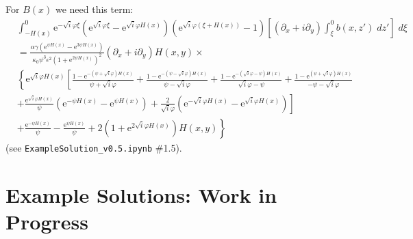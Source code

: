 \documentclass[10pt]{amsart}
\begin{document}
For $B(x)$ we need this term:
 \begin{align}
& \int_{-H(x)}^{0} 
\mathrm{e}^{-\sqrt{i} \varphi \xi} 
\left(
\mathrm{e}^{\sqrt{i} \varphi \xi} - 
\mathrm{e}^{\sqrt{i} \varphi H(x)} 
\right) \left(
\mathrm{e}^{\sqrt{i} \varphi  \left( \xi + H(x) \right)} - 1
\right)
 \left[ \left( \partial_x + i \partial_y \right) \int_{\xi}^{0} b(x,z') \; dz'  \right] \; d \xi   \nonumber  \\
& =
\frac{ \alpha  \gamma\left(\mathrm{e}^{\psi H(x)} -  \mathrm{e}^{3 \psi H(x)}  \right)}{\kappa_0  \psi^{3} \epsilon^{2} \left( 1 + \mathrm{e}^{2 \psi H(x)} \right)^{2}}
\left( \partial_x + i \partial_y \right) H(x,y) \times \nonumber \\
&\left\{
   \mathrm{e}^{\sqrt{i} \varphi H(x) } 
   \left[
   \frac{1 - \mathrm{e}^{-\left( \psi + \sqrt{i} \varphi \right) H(x)}}{\psi + \sqrt{i} \varphi}
+ \frac{1 - \mathrm{e}^{-\left( \psi - \sqrt{i} \varphi \right) H(x)}}{\psi - \sqrt{i} \varphi}
+ \frac{1 - \mathrm{e}^{-\left( \sqrt{i} \varphi - \psi \right) H(x)}}{\sqrt{i} \varphi - \psi}
+ \frac{1 - \mathrm{e}^{  \left( \psi + \sqrt{i} \varphi \right) H(x)}}{-\psi - \sqrt{i} \varphi}
\right.\right. \nonumber \\ 
& \left.\left.
+ \frac{\mathrm{e}^{\sqrt{i} \varphi H(x)}}{\psi} \left(      \mathrm{e}^{- \psi H(x) }
-  \mathrm{e}^{  \psi H(x) } \right)
+ \frac{2}{\sqrt{i} \varphi} \left( \mathrm{e}^{- \sqrt{i} \varphi H(x) }
-   \mathrm{e}^{ \sqrt{i} \varphi H(x)} \right)
\right] \right. \nonumber \\
& \left.
+ \frac{  \mathrm{e}^{-\psi H(x)}}{\psi}
- \frac{  \mathrm{e}^{ \psi H(x)}}{\psi}
+ 2 \left( 1 +  \mathrm{e}^{2 \sqrt{i} \varphi H(x)}\right) H(x,y)
\right\}
\end{align}
(see \texttt{ExampleSolution\_v0.5.ipynb} \#1.5).


\section{Example Solutions: Work in Progress}
\end{document}
